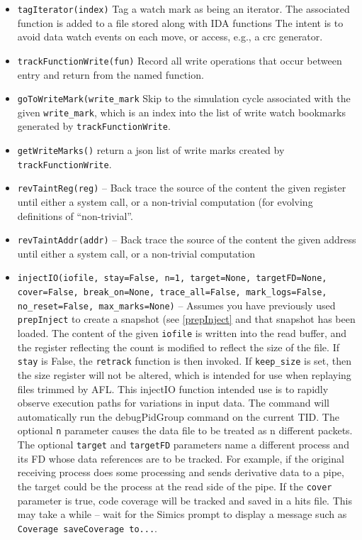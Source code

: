 \documentclass[titlepage]{article}
\begin{document}
\begin{itemize}
\item {\tt tagIterator(index)} Tag a watch mark as being an iterator.  The associated function is added to a file stored along with IDA functions
The intent is to avoid data watch events on each move, or access, e.g., a crc generator.

\item {\tt trackFunctionWrite(fun)} Record all write operations that occur between entry and return from the named function.

\item {\tt goToWriteMark(write\_mark} Skip to the simulation cycle associated with the given {\tt write\_mark}, which is an index into the list of 
write watch bookmarks generated by {\tt trackFunctionWrite}.

\item {\tt getWriteMarks()} return a json list of write marks created by {\tt trackFunctionWrite}.

\item {\tt revTaintReg(reg)} – Back trace the source of the content the given register until either a system call, or a non-trivial computation (for evolving definitions of “non-trivial”.  

\item {\tt revTaintAddr(addr)} -- Back trace the source of the content the given address until either a system call, or a non-trivial computation

\item {\tt injectIO(iofile, stay=False, n=1, target=None, targetFD=None, cover=False, break\_on=None, trace\_all=False, mark\_logs=False, no\_reset=False, max\_marks=None)} -- Assumes you have previously used {\tt prepInject}
to create a snapshot (see \ref{prepInject} and that snapshot has been loaded.
The content of the given {\tt iofile} is written into the read buffer, and the register reflecting 
the count is modified to reflect the size of the file.  If {\tt stay} is False, the {\tt retrack} function is then invoked. If {\tt keep\_size} is
set, then the size register will not be altered, which is intended for use when replaying files trimmed by AFL.
This injectIO function intended use is to rapidly observe execution paths for variations in input data. The command will automatically
run the debugPidGroup command on the current TID. The optional {\tt n} parameter causes the data file to be treated as n different packets.
The optional {\tt target} and {\tt targetFD} parameters name a different process and its FD whose data references are to be tracked.  For example,
if the original receiving process does some processing and sends derivative data to a pipe, the target could be the process at the read side
of the pipe.  If the {\tt cover} parameter is true, code coverage will be tracked and saved in a hits file.  This may take a while -- wait for the
Simics prompt to display a message such as {\tt Coverage saveCoverage to...}.


\end{itemize}
\end{document}
